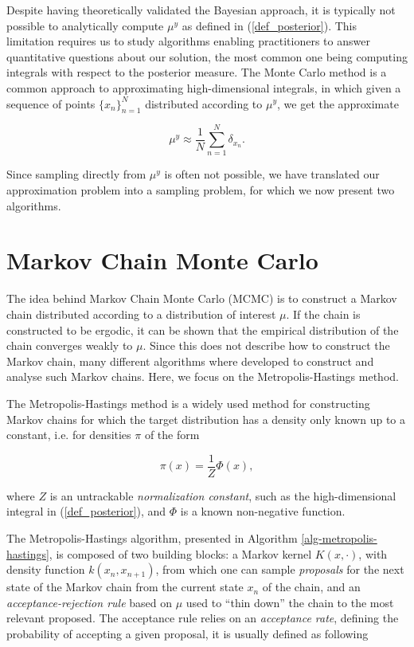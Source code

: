\documentclass{article}
\begin{document}
Despite having theoretically validated the Bayesian approach, it is typically not possible to analytically compute $\mu^y$ as defined in (\ref{def_posterior}). This limitation requires us to study algorithms enabling practitioners to answer quantitative questions about our solution, the most common one being computing integrals with respect to the posterior measure. The Monte Carlo method is a common approach to approximating high-dimensional integrals, in which given a sequence of points $\{x_n\}_{n=1}^N$ distributed according to $\mu^y$, we get the approximate

\begin{equation}
  \mu^y \approx \frac{1}{N}\sum_{n=1}^N \delta_{x_n} .
\end{equation}

Since sampling directly from $\mu^y$ is often not possible, we have translated our approximation problem into a sampling problem, for which we now present two algorithms.

\section{Markov Chain Monte Carlo}

The idea behind Markov Chain Monte Carlo (MCMC) is to construct a Markov chain distributed according to a distribution of interest $\mu$. If the chain is constructed to be ergodic, it can be shown that the empirical distribution of the chain converges weakly to $\mu$. Since this does not describe how to construct the Markov chain, many different algorithms where developed to construct and analyse such Markov chains. Here, we focus on the Metropolis-Hastings method.

The Metropolis-Hastings method is a widely used method for constructing Markov chains for which the target distribution has a density only known up to a constant, i.e. for densities $\pi$ of the form

\begin{equation}
  \pi(x) = \frac{1}{Z}\Phi(x),
\end{equation}

where $Z$ is an untrackable \textit{normalization constant}, such as the high-dimensional integral in (\ref{def_posterior}), and $\Phi$ is a known non-negative function.

The Metropolis-Hastings algorithm, presented in Algorithm \ref{alg-metropolis-hastings}, is composed of two building blocks: a Markov kernel $K(x, \cdot)$, with density function $k(x_n, x_{n+1})$, from which one can sample \textit{proposals} for the next state of the Markov chain from the current state $x_n$ of the chain, and an \textit{acceptance-rejection rule} based on $\mu$ used to ``thin down'' the chain to the most relevant proposed. The acceptance rule relies on an \textit{acceptance rate}, defining the probability of accepting a given proposal, it is usually defined as following
\end{document}
